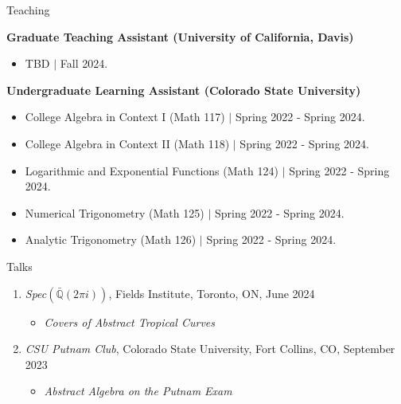 \documentclass[
	11pt, %
]{resume} %
\newcommand{\Q}{\mathbb{Q}}
\begin{document}
\begin{rSection}{Teaching}


	\textbf{Graduate Teaching Assistant (University of California, Davis)}
	\begin{itemize}
		\item{TBD $\mid$ Fall 2024.}
	\end{itemize}

	\textbf{Undergraduate Learning Assistant (Colorado State University)}
	\begin{itemize}
		\item{College Algebra in Context I (Math 117)  $\mid$ Spring 2022 - Spring 2024.}
		\item{College Algebra in Context II (Math 118) $\mid$ Spring 2022 - Spring 2024.}
		\item{Logarithmic and Exponential Functions (Math 124) $\mid$ Spring 2022 - Spring 2024.}
		\item{Numerical Trigonometry (Math 125) $\mid$ Spring 2022 - Spring 2024.}
		\item{Analytic Trigonometry (Math 126) $\mid$ Spring 2022 - Spring 2024.}\\
	\end{itemize}
	
\end{rSection}


\begin{rSection}{Talks}

	\begin{enumerate}

		\item \textit{Spec}$(\bar{\Q}(2\pi i))$, Fields Institute, Toronto, ON, June 2024
		\begin{itemize}
			\item \textit{Covers of Abstract Tropical Curves}
		\end{itemize}

		\item \textit{CSU Putnam Club}, Colorado State University, Fort Collins, CO, September 2023
		\begin{itemize}
			\item \textit{Abstract Algebra on the Putnam Exam}\\
		\end{itemize}

	\end{enumerate}
	
\end{rSection}
\end{document}
